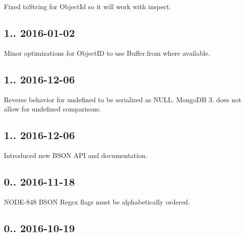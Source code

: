 \begin{DoxyItemize}
\item Fixed to\+String for Object\+Id so it will work with inspect.
\end{DoxyItemize}

\subsection*{1.. 2016-\/01-\/02 }


\begin{DoxyItemize}
\item Minor optimizations for Object\+ID to use Buffer.\+from where available.
\end{DoxyItemize}

\subsection*{1.. 2016-\/12-\/06 }


\begin{DoxyItemize}
\item Reverse behavior for undefined to be serialized as N\+U\+LL. Mongo\+DB 3. does not allow for undefined comparisons.
\end{DoxyItemize}

\subsection*{1.. 2016-\/12-\/06 }


\begin{DoxyItemize}
\item Introduced new B\+S\+ON A\+PI and documentation.
\end{DoxyItemize}

\subsection*{0.. 2016-\/11-\/18 }


\begin{DoxyItemize}
\item N\+O\+D\+E-\/848 B\+S\+ON Regex flags must be alphabetically ordered.
\end{DoxyItemize}

\subsection*{0.. 2016-\/10-\/19 }


